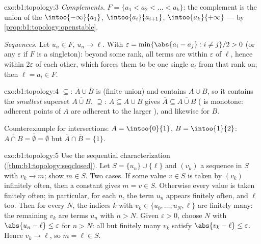 \begin{solution}{exo:b1:topology:3}
\emph{Complements.} $F = \{a_1 < a_2 < \dots < a_k\}$: the complement
is the union of the   $\intoo{-\infty}{a_1}$,
$\intoo{a_i}{a_{i+1}}$, $\intoo{a_k}{+\infty}$ ---  by
\cref{prop:b1:topology:openstable}.

\emph{Sequences.} Let $u_n \in F$, $u_n \to \ell$. With $\varepsilon
= \min\{\abs{a_i - a_j} : i \neq j\}/2 > 0$ (or any $\varepsilon$ if
$F$ is a singleton): beyond some rank, all terms are within
$\varepsilon$ of $\ell$, hence within $2\varepsilon$ of each other,
which forces them to be one single $a_i$ from that rank on; then
$\ell = a_i \in F$.
\end{solution}

\begin{solution}{exo:b1:topology:4}
$\subseteq$: $\overline A \cup \overline B$ is  (finite union)
and contains $A \cup B$, so it contains the \emph{smallest} 
superset $\overline{A \cup B}$. $\supseteq$: $A \subseteq A \cup B$
gives $\overline A \subseteq \overline{A \cup B}$ ( is
monotone: adherent points of $A$ are adherent to the larger ), and
likewise for $B$.

Counterexample for intersections: $A = \intoo{0}{1}$, $B =
\intoo{1}{2}$: $\overline{A \cap B} = \overline\emptyset = \emptyset$
but $\overline A \cap \overline B = \{1\}$.
\end{solution}

\begin{solution}{exo:b1:topology:5}
Use the sequential characterization
(\cref{thm:b1:topology:seqclosed}). Let $S = \{u_n\} \cup \{\ell\}$
and $(v_k)$ a sequence in $S$ with $v_k \to m$; show $m \in S$. Two
cases. If some value $v \in S$ is taken by $(v_k)$ infinitely often,
then a constant  gives $m = v \in S$. Otherwise every
value is taken finitely often; in particular, for each $n$, the term
$u_n$ appears finitely often, and $\ell$ too. Then for every $N$, the
indices $k$ with $v_k \in \{u_0, \dots, u_N, \ell\}$ are finitely
many: the remaining $v_k$ are terms $u_n$ with $n > N$. Given
$\varepsilon > 0$, choose $N$ with $\abs{u_n - \ell} \leq
\varepsilon$ for $n > N$: all but finitely many $v_k$ satisfy
$\abs{v_k - \ell} \leq \varepsilon$. Hence $v_k \to \ell$, so $m =
\ell \in S$.
\end{solution}

